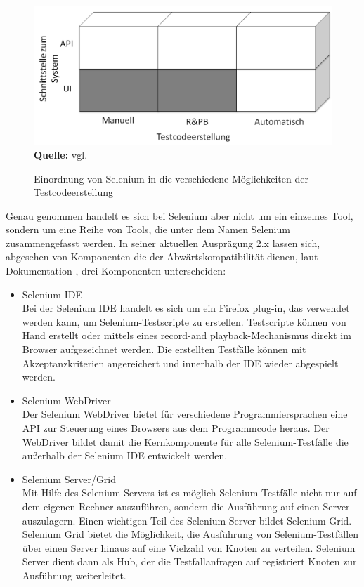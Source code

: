 \begin{figure}[htb]
  \centering  
  \includegraphics[scale=0.7]{img/bereicheTestcodeerstellungSelenium.png}\\
  \footnotesize\sffamily\textbf{Quelle:} vgl. \cite{meszaros_agile_2003}
  \caption{Einordnung von Selenium in die verschiedene Möglichkeiten der Testcodeerstellung}
  \label{fig:bereicheTestcodeerstellungSelenium}
\end{figure}

Genau genommen handelt es sich bei Selenium aber nicht um ein einzelnes Tool, sondern um eine Reihe von Tools, die unter dem Namen Selenium zusammengefasst werden.
In seiner aktuellen Ausprägung 2.x lassen sich, abgesehen von Komponenten die der Abwärtskompatibilität dienen, laut Dokumentation \cite{selenium_selenium_2015-1}, drei Komponenten unterscheiden:

\begin{itemize}
\item Selenium IDE \\
Bei der Selenium IDE handelt es sich um ein Firefox plug-in, das verwendet werden kann, um Selenium-Testscripte zu erstellen. Testscripte können von Hand erstellt oder mittels eines \grq record-and playback\grq -Mechanismus direkt im Browser aufgezeichnet werden. Die erstellten Testfälle können mit Akzeptanzkriterien angereichert und innerhalb der IDE wieder abgespielt werden.
\item Selenium WebDriver \\
Der Selenium WebDriver bietet für verschiedene Programmiersprachen eine API zur Steuerung eines Browsers aus dem Programmcode heraus. Der WebDriver bildet damit die Kernkomponente für alle Selenium-Testfälle die außerhalb der Selenium IDE entwickelt werden.

\item Selenium Server/Grid \\
Mit Hilfe des Selenium Servers ist es möglich Selenium-Testfälle nicht nur auf dem eigenen Rechner auszuführen, sondern die Ausführung auf einen Server auszulagern. Einen wichtigen Teil des Selenium Server bildet Selenium Grid. Selenium Grid bietet die Möglichkeit, die Ausführung von Selenium-Testfällen über einen Server hinaus auf eine Vielzahl von Knoten zu verteilen. Selenium Server dient dann als Hub, der die Testfallanfragen auf registriert Knoten zur Ausführung weiterleitet. 
\end{itemize}



